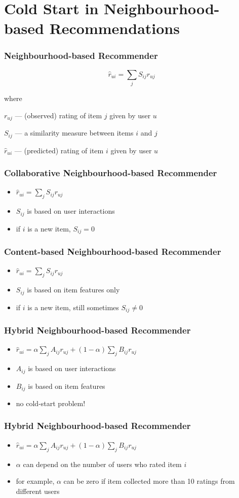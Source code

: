 \documentclass[t]{beamer}
\begin{document}
\section{Cold Start in Neighbourhood-based Recommendations}
\begin{frame}
  \frametitle{Neighbourhood-based Recommender}
  $$\hat{r}_{ui}=\sum\limits_jS_{ij}r_{uj}$$

  where

  $r_{uj}$ --- (observed) rating of item $j$ given by user $u$

  $S_{ij}$ --- a similarity measure between items $i$ and $j$

  $\hat{r}_{ui}$ --- (predicted) rating of item $i$ given by user $u$
\end{frame}  
\begin{frame}
  \frametitle{Collaborative Neighbourhood-based Recommender}
  \begin{itemize}
  \item $\hat{r}_{ui}=\sum\limits_jS_{ij}r_{uj}$
  \item $S_{ij}$ is based on user interactions
  \item if $i$ is a new item, $S_{ij}=0$
  \end{itemize}
\end{frame}
\begin{frame}
  \frametitle{Content-based Neighbourhood-based Recommender}
  \begin{itemize}
  \item $\hat{r}_{ui}=\sum\limits_jS_{ij}r_{uj}$
  \item $S_{ij}$ is based on item features only
  \item if $i$ is a new item, still sometimes $S_{ij}\ne0$
  \end{itemize}
\end{frame}
\begin{frame}
  \frametitle{Hybrid Neighbourhood-based Recommender}
  \begin{itemize}
  \item $\hat{r}_{ui}=\alpha\sum\limits_jA_{ij}r_{uj}+\left(1-\alpha\right)\sum\limits_jB_{ij}r_{uj}$
  \item $A_{ij}$ is based on user interactions
  \item $B_{ij}$ is based on item features
  \item no cold-start problem!
  \end{itemize}
\end{frame}
\begin{frame}
  \frametitle{Hybrid Neighbourhood-based Recommender}
  \begin{itemize}
  \item $\hat{r}_{ui}=\alpha\sum\limits_jA_{ij}r_{uj}+\left(1-\alpha\right)\sum\limits_jB_{ij}r_{uj}$
  \item $\alpha$ can depend on the number of users who rated item $i$
  \item for example, $\alpha$ can be zero if item collected more than 10 ratings from different users
  \end{itemize}
\end{frame}
\end{document}
